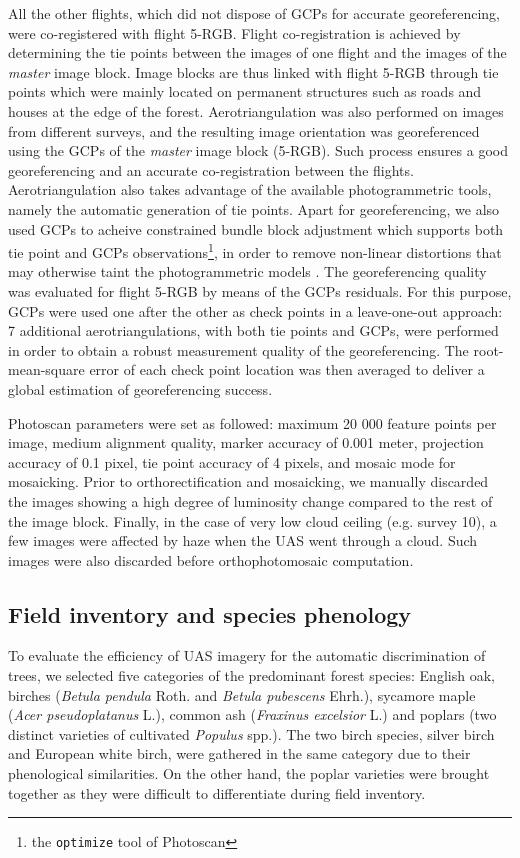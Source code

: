 \documentclass[remotesensing,article,submit,moreauthors,pdftex,12pt,a4paper]{mdpi} %
\begin{document}
All the other flights, which did not dispose of GCPs for accurate georeferencing, were co-registered with flight 5-RGB. 
Flight co-registration is achieved by determining the tie points between the images of one flight and the images of the {\it master} image block. 
Image blocks are thus linked with flight 5-RGB through tie points which were mainly located on permanent structures such as roads and houses at the edge of the forest. 
Aerotriangulation was also performed on images from different surveys, and the resulting image orientation was georeferenced using the GCPs of the {\it master} image block (5-RGB). 
Such process ensures a good georeferencing and an accurate co-registration between the flights. Aerotriangulation also takes advantage of the available photogrammetric tools, namely the automatic generation of tie points. 
Apart for georeferencing, we also used GCPs to acheive constrained bundle block adjustment which supports both tie point and GCPs observations\footnote{the \texttt{optimize} tool of Photoscan}, in order to remove non-linear distortions that may otherwise taint the photogrammetric models \citep{wu_critical_2014}. 
The georeferencing quality was evaluated for flight 5-RGB by means of the GCPs residuals. 
For this purpose, GCPs were used one after the other as check points in a leave-one-out approach: 7 additional aerotriangulations, with both tie points and GCPs, were performed in order to obtain a robust measurement quality of the georeferencing. 
The root-mean-square error of each check point location was then averaged to deliver a global estimation of georeferencing success.

Photoscan parameters were set as followed: maximum 20 000 feature points per image, medium alignment quality, marker accuracy of 0.001 meter, projection accuracy of 0.1 pixel, tie point accuracy of 4 pixels, and mosaic mode for mosaicking. 
Prior to orthorectification and mosaicking, we manually discarded the images showing a high degree of luminosity change compared to the rest of the image block. 
Finally, in the case of very low cloud ceiling (e.g. survey 10), a few images were affected by haze when the UAS went through a cloud. 
Such images were also discarded before orthophotomosaic computation.

\subsection{Field inventory and species phenology}

To evaluate the efficiency of UAS imagery for the automatic discrimination of trees, we selected five categories of the predominant forest species: English oak, birches (\textit{Betula pendula} Roth. and \textit{Betula pubescens} Ehrh.), sycamore maple (\textit{Acer pseudoplatanus} L.), common ash (\textit{Fraxinus excelsior} L.) and poplars (two distinct varieties of cultivated \textit{Populus} spp.). 
The two birch species, silver birch and European white birch, were gathered in the same category due to their phenological similarities. 
On the other hand, the poplar varieties were brought together as they were difficult to differentiate during field inventory. 
\end{document}
